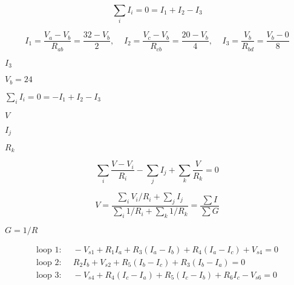 {\newpage\clearpage
{}%
\begin{displaymath}
  \sum_i I_i=0=I_1+I_2-I_3	
  \end{displaymath}%
\lthtmldisplayZ
\lthtmlcheckvsize\clearpage}

{\newpage\clearpage
{}%
\begin{displaymath}
  I_1=\frac{V_a-V_b}{R_{ab}}=\frac{32-V_b}{2},\;\;\;\;
  I_2=\frac{V_c-V_b}{R_{cb}}=\frac{20-V_b}{4},\;\;\;\;
  I_3=\frac{V_b}{R_{bd}}=\frac{V_b-0}{8}  
  \end{displaymath}%
\lthtmldisplayZ
\lthtmlcheckvsize\clearpage}

{\newpage\clearpage
{}%
$I_3$%
\lthtmlinlinemathZ
\lthtmlcheckvsize\clearpage}

{\newpage\clearpage
{}%
$V_b=24$%
\lthtmlinlinemathZ
\lthtmlcheckvsize\clearpage}

{\newpage\clearpage
{}%
$\sum_i I_i=0=-I_1+I_2-I_3$%
\lthtmlinlinemathZ
\lthtmlcheckvsize\clearpage}

{\newpage\clearpage
{}%
$V$%
\lthtmlinlinemathZ
\lthtmlcheckvsize\clearpage}

{\newpage\clearpage
{}%
$I_j$%
\lthtmlinlinemathZ
\lthtmlcheckvsize\clearpage}

{\newpage\clearpage
{}%
$R_k$%
\lthtmlinlinemathZ
\lthtmlcheckvsize\clearpage}

{\newpage\clearpage
{}%
\begin{displaymath} 
  \sum_i \frac{V-V_i}{R_i}-\sum_j I_j+\sum_k \frac{V}{R_k}=0 
  \end{displaymath}%
\lthtmldisplayZ
\lthtmlcheckvsize\clearpage}

{\newpage\clearpage
{}%
\begin{displaymath} 
  V=\frac{\sum_i V_i/R_i+\sum_j I_j}{\sum_i 1/R_i+\sum_k 1/R_k}=\frac{\sum I}{\sum G} 
  \end{displaymath}%
\lthtmldisplayZ
\lthtmlcheckvsize\clearpage}

{\newpage\clearpage
{}%
$G=1/R$%
\lthtmlinlinemathZ
\lthtmlcheckvsize\clearpage}

{\newpage\clearpage
{}%
\begin{displaymath} \begin{array}{l}
    \mbox{loop 1:}\;\;\;\;\;-V_{s1}+R_1I_a+R_3(I_a-I_b)+R_4(I_a-I_c)+V_{s4}=0 \\
    \mbox{loop 2:}\;\;\;\;\;R_2I_b+V_{s2}+R_5(I_b-I_c)+R_3(I_b-I_a)=0 \\
    \mbox{loop 3:}\;\;\;\;\;-V_{s4}+R_4(I_c-I_a)+R_5(I_c-I_b)+R_6I_c-V_{s6}=0 
  \end{array} \end{displaymath}%
\lthtmldisplayZ
\lthtmlcheckvsize\clearpage}

